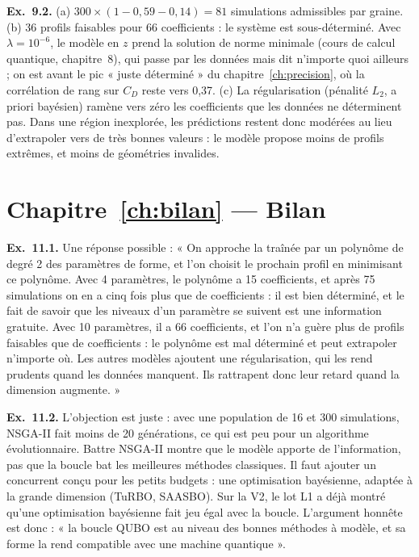 \textbf{Ex.~9.2.} (a) $300\times(1-0{,}59-0{,}14)=81$ simulations admissibles par graine. (b) 36 profils faisables pour 66 coefficients : le système est sous-déterminé. Avec $\lambda=10^{-6}$, le modèle en $z$ prend la solution de norme minimale (cours de calcul quantique, chapitre~8), qui passe par les données mais dit n'importe quoi ailleurs ; on est avant le pic « juste déterminé » du chapitre~\ref{ch:precision}, où la corrélation de rang sur $C_D$ reste vers 0,37. (c) La régularisation (pénalité $L_2$, a priori bayésien) ramène vers zéro les coefficients que les données ne déterminent pas. Dans une région inexplorée, les prédictions restent donc modérées au lieu d'extrapoler vers de très bonnes valeurs : le modèle propose moins de profils extrêmes, et moins de géométries invalides.

\section*{Chapitre~\ref{ch:bilan} — Bilan}
\textbf{Ex.~11.1.} Une réponse possible : « On approche la traînée par un polynôme de degré 2 des paramètres de forme, et l'on choisit le prochain profil en minimisant ce polynôme. Avec 4 paramètres, le polynôme a 15 coefficients, et après 75 simulations on en a cinq fois plus que de coefficients : il est bien déterminé, et le fait de savoir que les niveaux d'un paramètre se suivent est une information gratuite. Avec 10 paramètres, il a 66 coefficients, et l'on n'a guère plus de profils faisables que de coefficients : le polynôme est mal déterminé et peut extrapoler n'importe où. Les autres modèles ajoutent une régularisation, qui les rend prudents quand les données manquent. Ils rattrapent donc leur retard quand la dimension augmente. »

\textbf{Ex.~11.2.} L'objection est juste : avec une population de 16 et 300 simulations, NSGA-II fait moins de 20 générations, ce qui est peu pour un algorithme évolutionnaire. Battre NSGA-II montre que le modèle apporte de l'information, pas que la boucle bat les meilleures méthodes classiques. Il faut ajouter un concurrent conçu pour les petits budgets : une optimisation bayésienne, adaptée à la grande dimension (TuRBO, SAASBO). Sur la V2, le lot L1 a déjà montré qu'une optimisation bayésienne fait jeu égal avec la boucle. L'argument honnête est donc : « la boucle QUBO est au niveau des bonnes méthodes à modèle, et sa forme la rend compatible avec une machine quantique ».

